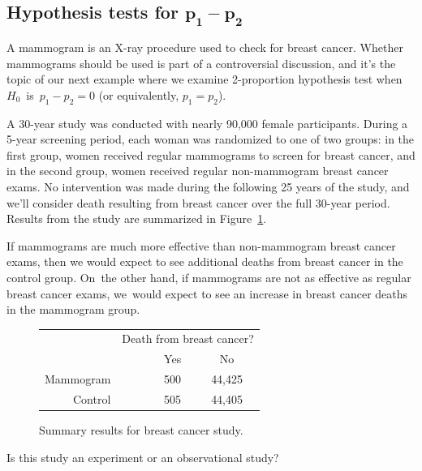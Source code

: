 \subsection[Hypothesis tests for $p_1 - p_2$]
    {Hypothesis tests for $\mathbf{p_1 - p_2}$}


A mammogram is an X-ray procedure used to check for breast cancer. Whether mammograms should be used is part of a controversial discussion, and it's the topic of our next example where we examine 2-proportion hypothesis test when $H_0$~is~$p_1 - p_2 = 0$ (or equivalently, $p_1 = p_2$).

A 30-year study was conducted with nearly 90,000 female participants. During a 5-year screening period, each woman was randomized to one of two groups: in the first group, women received regular mammograms to screen for breast cancer, and in the second group, women received regular non-mammogram breast cancer exams. No intervention was made during the following 25 years of the study, and we'll consider death resulting from breast cancer over the full 30-year period. Results from the study are summarized in Figure~\ref{mammogramStudySummaryTable}.

If mammograms are much more effective than non-mammogram breast cancer exams, then we would expect to see additional deaths from breast cancer in the control group. On~the other hand, if mammograms are not as effective as regular breast cancer exams, we~would expect to see an increase in breast cancer deaths in the mammogram group.

\begin{figure}[h]
\centering
\begin{tabular}{rrcc}
	& \multicolumn{3}{c}{Death from breast cancer?} \\
  \cline{2-4}
 & \ \hspace{3mm}\ & Yes & No \\
  \hline
Mammogram && 500 & 44,425 \\
Control && 505 & 44,405 \\
   \hline
\end{tabular}
\caption{Summary results for breast cancer study.}
\label{mammogramStudySummaryTable}
\end{figure}

\begin{exercisewrap}
\begin{nexercise}
Is this study an experiment or an observational study?\footnotemark
\end{nexercise}
\end{exercisewrap}

